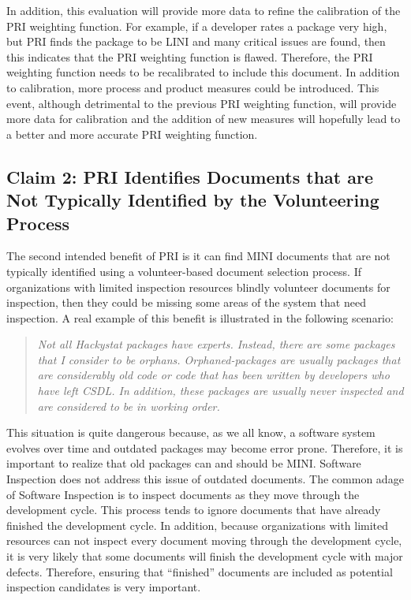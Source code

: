 In addition, this evaluation will provide more data to refine the
calibration of the PRI weighting function.  For example, if a developer
rates a package very high, but PRI finds the package to be LINI and many
critical issues are found, then this indicates that the PRI weighting
function is flawed. Therefore, the PRI weighting function needs to be
recalibrated to include this document. In addition to calibration, more
process and product measures could be introduced. This event, although
detrimental to the previous PRI weighting function, will provide more data
for calibration and the addition of new measures will hopefully lead to a
better and more accurate PRI weighting function.



\subsection{Claim 2: PRI Identifies Documents that are Not Typically
  Identified by the Volunteering Process}
\label{sec:claim2}
The second intended benefit of PRI is it can find MINI documents that are
not typically identified using a volunteer-based document selection
process.  If organizations with limited inspection resources blindly
volunteer documents for inspection, then they could be missing some areas
of the system that need inspection. A real example of this benefit is
illustrated in the following scenario:

\begin{quotation}
  \textit{ Not all Hackystat packages have experts. Instead, there are some
    packages that I consider to be orphans. Orphaned-packages are usually
    packages that are considerably old code or code that has been written
    by developers who have left CSDL. In addition, these packages are
    usually never inspected and are considered to be in working order.  }
\end{quotation}

This situation is quite dangerous because, as we all know, a software
system evolves over time and outdated packages may become error prone.
Therefore, it is important to realize that old packages can and should be
MINI. Software Inspection \cite{Gilb93} does not address this issue of
outdated documents.  The common adage of Software Inspection is to inspect
documents as they move through the development cycle. This process tends to
ignore documents that have already finished the development cycle. In
addition, because organizations with limited resources can not inspect
every document moving through the development cycle, it is very likely that
some documents will finish the development cycle with major defects.
Therefore, ensuring that ``finished'' documents are included as potential
inspection candidates is very important.


